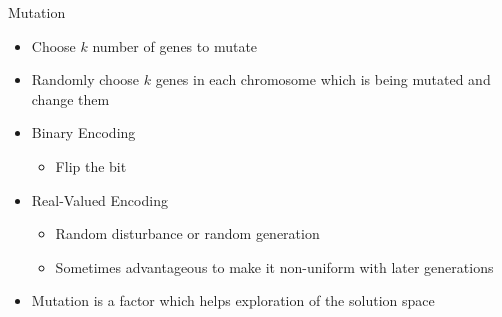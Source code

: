 \documentclass[]{beamer}
\begin{document}
\begin{frame}{Mutation}
\begin{itemize}
\item Choose \(k\) number of genes to mutate
\item Randomly choose \(k\) genes in each chromosome which is being mutated and change them
\item[] Binary Encoding
    \begin{itemize}
    \item Flip the bit
    \end{itemize}
\item[] Real-Valued Encoding
    \begin{itemize}
    \item Random disturbance or random generation
    \item Sometimes advantageous to make it non-uniform with later generations
    \end{itemize}
\item Mutation is a factor which helps exploration of the solution space
\end{itemize}
\end{frame}



\end{document}
